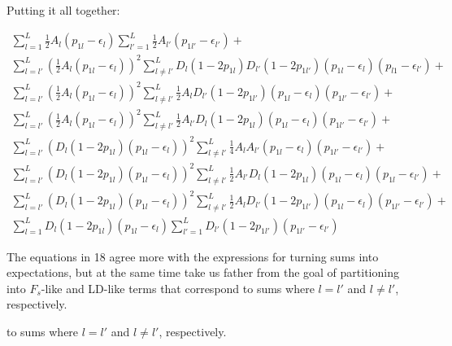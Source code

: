 \documentclass[a4paper,10pt]{article}
\begin{document}
Putting it all together:

\begin{equation}
  \begin{split}
   \sum^L_{l=1}\frac{1}{2}A_l(p_{1l}-\epsilon_{l})
   \sum^L_{l'=1}\frac{1}{2}A_{l'}(p_{1l'}-\epsilon_{l'}) +
   \\
   \sum^L_{l=l'}(\frac{1}{2}A_l(p_{1l}-\epsilon_l))^2 \sum^L_{l \neq
     l'}D_l(1-2p_{1l})D_{l'}(1-2p_{1l'})(p_{1l}-\epsilon_l)(p_{l1}-\epsilon_{l'})+ 
   \\
     \sum^L_{l=l'}(\frac{1}{2}A_l(p_{1l}-\epsilon_l))^2\sum^L_{l \neq
       l'}\frac{1}{2}A_{l}D_{l'}(1-2p_{1l'})(p_{1l}-\epsilon_l)(p_{1l'}-\epsilon_{l'})+
     \\
     \sum^L_{l=l'}(\frac{1}{2}A_l(p_{1l}-\epsilon_l))^2\sum^L_{l \neq
       l'}\frac{1}{2}A_{l'}D_l(1-2p_{1l})(p_{1l}-\epsilon_l)(p_{1l'}-\epsilon_{l'})+
   \\
   \sum^L_{l=l'}(D_l(1-2p_{1l})(p_{1l}-\epsilon_l))^2 \sum^L_{l \neq
     l'}\frac{1}{4}A_lA_{l'}(p_{1l}-\epsilon_l)(p_{1l'}-\epsilon_{l'}) +
   \\
   \sum^L_{l=l'}(D_l(1-2p_{1l})(p_{1l}-\epsilon_l))^2 \sum^L_{l\neq
     l'}
   \frac{1}{2}A_{l'}D_l(1-2p_{1l})(p_{1l}-\epsilon_l)(p_{1l}-\epsilon_{l'})+
   \\
   \sum^L_{l=l'}(D_l(1-2p_{1l})(p_{1l}-\epsilon_l))^2 \sum^L_{l\neq
     l'}
   \frac{1}{2}A_{l}D_{l'}(1-2p_{1l'})(p_{1l}-\epsilon_l)(p_{1l'}-\epsilon_{l'})+
   \\
    \sum^L_{l=1}D_l(1-2p_{1l})(p_{1l}-\epsilon_l) \sum^L_{l'=1}D_{l'}(1-2p_{1l'})(p_{1l'}-\epsilon_{l'})
 \end{split} \label{big-expansion}
\end{equation}

   
The equations in 18 agree more with the expressions for turning sums
into expectations, but at the same time take us father from the goal
of partitioning into $ F_{s}$-like and LD-like terms that correspond
to sums where $l = l'$ and $ l \neq l'$, respectively. 

to sums where $l = l'$ and $ l \neq l'$, respectively.
\end{document}
